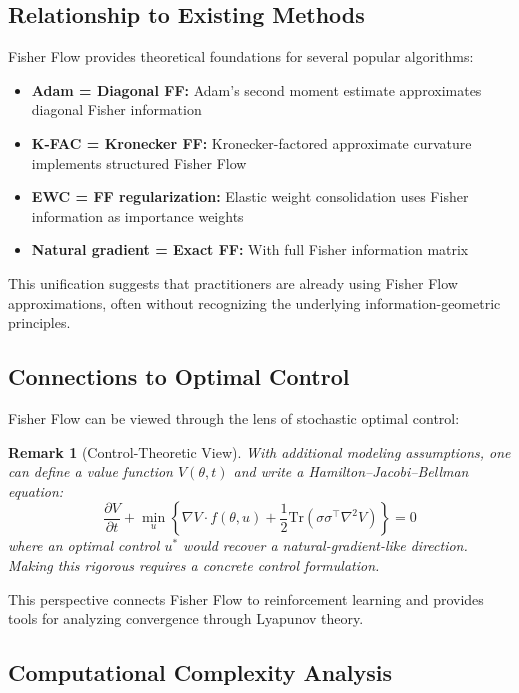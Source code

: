\documentclass[11pt]{article}
\newtheorem{remark}[theorem]{Remark}
\begin{document}
\subsection{Relationship to Existing Methods}

Fisher Flow provides theoretical foundations for several popular algorithms:

\begin{itemize}
\item \textbf{Adam = Diagonal FF:} Adam's second moment estimate approximates diagonal Fisher information
\item \textbf{K-FAC = Kronecker FF:} Kronecker-factored approximate curvature implements structured Fisher Flow
\item \textbf{EWC = FF regularization:} Elastic weight consolidation uses Fisher information as importance weights
\item \textbf{Natural gradient = Exact FF:} With full Fisher information matrix
\end{itemize}

This unification suggests that practitioners are already using Fisher Flow approximations, often without recognizing the underlying information-geometric principles.

\subsection{Connections to Optimal Control}

Fisher Flow can be viewed through the lens of stochastic optimal control:

\begin{remark}[Control-Theoretic View]
With additional modeling assumptions, one can define a value function $V(\theta, t)$ and write a Hamilton--Jacobi--Bellman equation:
\begin{equation}
\frac{\partial V}{\partial t} + \min_u \left\{\nabla V \cdot f(\theta, u) + \frac{1}{2}\text{Tr}(\sigma\sigma^\top \nabla^2 V)\right\} = 0
\end{equation}
where an optimal control $u^*$ would recover a natural-gradient-like direction. Making this rigorous requires a concrete control formulation.
\end{remark}

This perspective connects Fisher Flow to reinforcement learning and provides tools for analyzing convergence through Lyapunov theory.

\subsection{Computational Complexity Analysis}
\end{document}

